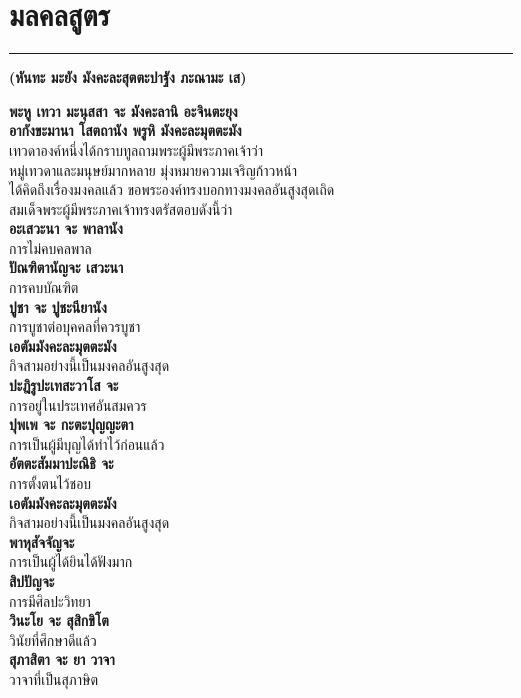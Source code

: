 \documentclass[12pt]{article}
\begin{document}
\section{มลคลสูตร}
\hrule
\begin{center}
\textbf{(หันทะ มะยัง มังคะละสุตตะปาฐัง ภะณามะ เส)}
\end{center}
\textbf{พะหู เทวา มะนุสสา จะ มังคะลานิ อะจินตะยุง \\
อากังขะมานา โสตถานัง พรูหิ มังคะละมุตตะมัง}\\
\indent เทวดาองค์หนึ่งได้กราบทูลถามพระผู้มีพระภาคเจ้าว่า \\
\indent หมู่เทวดาและมนุษย์มากหลาย มุ่งหมายความเจริญก้าวหน้า \\
\indent ได้คิดถึงเรื่องมงคลแล้ว ขอพระองค์ทรงบอกทางมงคลอันสูงสุดเถิด\\
\indent สมเด็จพระผู้มีพระภาคเจ้าทรงตรัสตอบดังนี้ว่า\\
\textbf{อะเสวะนา จะ พาลานัง}\\
\indent การไม่คบคลพาล\\
\textbf{ปัณฑิตานัญจะ เสวะนา}\\
\indent การคบบัณฑิต\\
\textbf{ปูชา จะ ปูชะนียานัง}\\
\indent การบูชาต่อบุคคลที่ควรบูชา\\
\textbf{เอตัมมังคะละมุตตะมัง}\\
\indent กิจสามอย่างนี้เป็นมงคลอันสูงสุด\\
\textbf{ปะฎิรูปะเทสะวาโส จะ}\\
\indent การอยู่ในประเทศอันสมควร\\
\textbf{ปุพเพ จะ กะตะปุญญะตา}\\
\indent การเป็นผู้มีบุญได้ทำไว้ก่อนแล้ว\\
\textbf{อัตตะสัมมาปะณิธิ จะ}\\
\indent การตั้งตนไว้ชอบ\\
\textbf{เอตัมมังคะละมุตตะมัง}\\
\indent กิจสามอย่างนี้เป็นมงคลอันสูงสุด\\
\textbf{พาหุสัจจัญจะ}\\
\indent การเป็นผู้ได้ยินได้ฟังมาก\\
\textbf{สิปปัญจะ}\\
\indent การมีศิลปะวิทยา\\
\textbf{วินะโย จะ สุสิกขิโต}\\
\indent วินัยที่ศึกษาดีแล้ว\\
\textbf{สุภาสิตา จะ ยา วาจา}\\
\indent วาจาที่เป็นสุภาษิต\\
\end{document}
